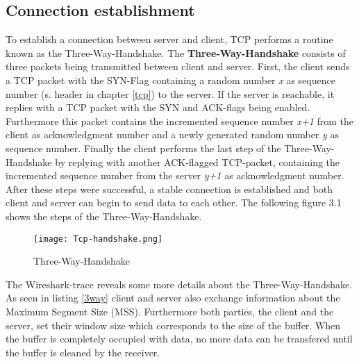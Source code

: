 \subsection{Connection establishment}
\label{con-est}
To establish a connection between server and client, TCP performs a routine known as the Three-Way-Handshake. The \textbf{Three-Way-Handshake} consists of three packets being transmitted between client and server. First, the client sends a TCP packet with the SYN-Flag containing a random number \textit{x} as sequence number (s. header in chapter \ref{tcp}) to the server. If the server is reachable, it replies with a TCP packet with the SYN and ACK-flags being enabled. Furthermore this packet contains the incremented sequence number \textit{x+1} from the client as acknowledgment number and a newly generated random number \textit{y} as sequence number. Finally the client performs the last step of the Three-Way-Handshake by replying with another ACK-flagged TCP-packet, containing the incremented sequence number from the server \textit{y+1} as acknowledgment number.\\
After these steps were successful, a stable connection is established and both client and server can begin to send data to each other. The following figure 3.1 shows the steps of the Three-Way-Handshake.
\begin{figure}[H]
	\centering
	\texttt{[image: Tcp-handshake.png]}
	\caption{Three-Way-Handshake}
	\label{three-way-handshake}
\end{figure}
The Wireshark-trace reveals some more details about the Three-Way-Handshake. As seen in listing \ref{3way} client and server also exchange information about the Maximum Segment Size (MSS).
Furthermore both parties, the client and the server, set their window size which corresponds to
the size of the buffer. When the buffer is completely occupied with data, no more data can be transfered until the buffer is cleaned by the receiver.

